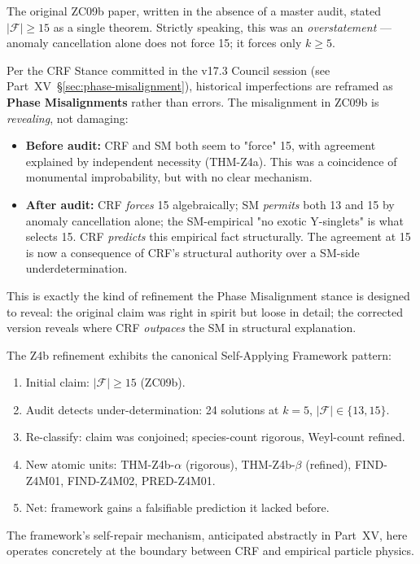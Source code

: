 \documentclass[12pt, a4paper]{article}
\begin{document}
The original ZC09b paper, written in the absence of a master audit,
stated $|\mathcal{F}| \geq 15$ as a single theorem. Strictly speaking,
this was an \emph{overstatement} — anomaly cancellation alone does
not force 15; it forces only $k \geq 5$.

Per the CRF Stance committed in the v17.3 Council session
(see Part~XV~\S\ref{sec:phase-misalignment}), historical imperfections
are reframed as \textbf{Phase Misalignments} rather than errors.
The misalignment in ZC09b is \emph{revealing}, not damaging:

\begin{itemize}[leftmargin=*, noitemsep]
\item \textbf{Before audit:} CRF and SM both seem to "force" 15, with
agreement explained by independent necessity (THM-Z4a). This was
a coincidence of monumental improbability, but with no clear mechanism.

\item \textbf{After audit:} CRF \emph{forces} 15 algebraically;
SM \emph{permits} both 13 and 15 by anomaly cancellation alone;
the SM-empirical "no exotic Y-singlets" is what selects 15. CRF
\emph{predicts} this empirical fact structurally. The agreement at
15 is now a consequence of CRF's structural authority over a SM-side
underdetermination.
\end{itemize}

This is exactly the kind of refinement the Phase Misalignment stance
is designed to reveal: the original claim was right in spirit but
loose in detail; the corrected version reveals where CRF \emph{outpaces}
the SM in structural explanation.

\begin{formalbox}[title={Self-Repair Pattern (Part XV §\ref{sec:phase-misalignment} application)}]
The Z4b refinement exhibits the canonical Self-Applying Framework
pattern:
\begin{enumerate}[leftmargin=*, noitemsep]
  \item Initial claim: $|\mathcal{F}| \geq 15$ (ZC09b).
  \item Audit detects under-determination: 24 solutions at $k = 5$,
    $|\mathcal{F}| \in \{13, 15\}$.
  \item Re-classify: claim was conjoined; species-count rigorous,
    Weyl-count refined.
  \item New atomic units: THM-Z4b-$\alpha$ (rigorous), THM-Z4b-$\beta$
    (refined), FIND-Z4M01, FIND-Z4M02, PRED-Z4M01.
  \item Net: framework gains a falsifiable prediction it lacked before.
\end{enumerate}
The framework's self-repair mechanism, anticipated abstractly in
Part~XV, here operates concretely at the boundary between CRF and
empirical particle physics.
\end{formalbox}
\end{document}
